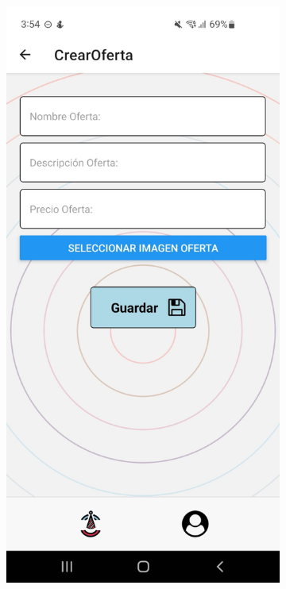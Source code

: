 \clearpage
\vspace*{\fill}
\begin{figure}[H]
    \centering
    \begin{subfigure}{0.45\textwidth}
        \centering
        \includegraphics[width=\linewidth]{imagenes/Capturas/CrearOferta.jpeg}

\end{subfigure}
\end{figure}
